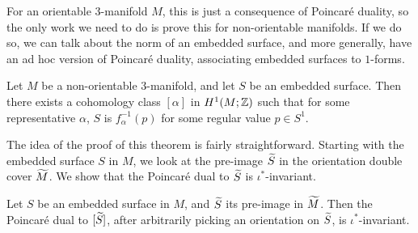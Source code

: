For an orientable $3$-manifold $M$, this is just a consequence of Poincar\'e duality, so the only
work we need to do is prove this for non-orientable manifolds. If we do so, we can talk about the
norm of an embedded surface, and more generally, have an ad hoc version of Poincar\'e duality,
associating embedded surfaces to $1$-forms.
\begin{thm}
  \label{thm:Poincare-duality}
  Let $M$ be a non-orientable $3$-manifold, and let $S$ be an embedded surface. Then
  there exists a cohomology class $[\alpha]$ in $H^1(M; \mathbb{Z})$ such that for some representative
  $\alpha$, $S$ is $f_{\alpha}^{-1}(p)$ for some regular value $p \in S^1$.
\end{thm}

The idea of the proof of this theorem is fairly straightforward. Starting with the embedded surface
$S$ in $M$, we look at the pre-image $\widetilde{S}$ in the orientation double cover $\widetilde{M}$. We show
that the Poincar\'e dual to $\widetilde{S}$ is $\iota^{\ast}$-invariant.
\begin{lem}
  \label{lem:PD1}
  Let $S$ be an embedded surface in $M$, and $\widetilde{S}$ its pre-image in $\widetilde{M}$. Then the
  Poincar\'e dual to $[\widetilde{S}]$, after arbitrarily picking an orientation on $\widetilde{S}$, is
  $\iota^{\ast}$-invariant.
\end{lem}
